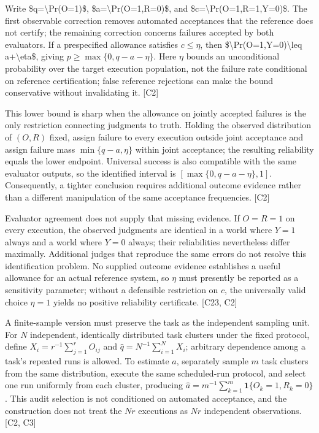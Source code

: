 \documentclass[11pt]{article}
\begin{document}
Write \$q=\textbackslash{}Pr(O=1)\$, \$a=\textbackslash{}Pr(O=1,R=0)\$, and \$c=\textbackslash{}Pr(O=1,R=1,Y=0)\$. The first observable correction removes automated acceptances that the reference does not certify; the remaining correction concerns failures accepted by both evaluators. If a prespecified allowance satisfies $c\leq\eta$, then \$\textbackslash{}Pr(O=1,Y=0)\textbackslash{}leq a+\textbackslash{}eta\$, giving $p\geq\max\{0,q-a-\eta\}$. Here $\eta$ bounds an unconditional probability over the target execution population, not the failure rate conditional on reference certification; false reference rejections can make the bound conservative without invalidating it. [C2]

This lower bound is sharp when the allowance on jointly accepted failures is the only restriction connecting judgments to truth. Holding the observed distribution of $(O,R)$ fixed, assign failure to every execution outside joint acceptance and assign failure mass $\min\{q-a,\eta\}$ within joint acceptance; the resulting reliability equals the lower endpoint. Universal success is also compatible with the same evaluator outputs, so the identified interval is $[\max\{0,q-a-\eta\},1]$. Consequently, a tighter conclusion requires additional outcome evidence rather than a different manipulation of the same acceptance frequencies. [C2]

Evaluator agreement does not supply that missing evidence. If $O=R=1$ on every execution, the observed judgments are identical in a world where $Y=1$ always and a world where $Y=0$ always; their reliabilities nevertheless differ maximally. Additional judges that reproduce the same errors do not resolve this identification problem. No supplied outcome evidence establishes a useful allowance for an actual reference system, so $\eta$ must presently be reported as a sensitivity parameter; without a defensible restriction on $c$, the universally valid choice $\eta=1$ yields no positive reliability certificate. [C23, C2]

A finite-sample version must preserve the task as the independent sampling unit. For $N$ independent, identically distributed task clusters under the fixed protocol, define $X_i=r^{-1}\sum_{j=1}^{r}O_{ij}$ and $\widehat q=N^{-1}\sum_{i=1}^{N}X_i$; arbitrary dependence among a task\textquoteright{}s repeated runs is allowed. To estimate $a$, separately sample $m$ task clusters from the same distribution, execute the same scheduled-run protocol, and select one run uniformly from each cluster, producing $\widehat a=m^{-1}\sum_{k=1}^{m}\mathbf{1}\{O_k=1,R_k=0\}$. This audit selection is not conditioned on automated acceptance, and the construction does not treat the $Nr$ executions as $Nr$ independent observations. [C2, C3]
\end{document}
